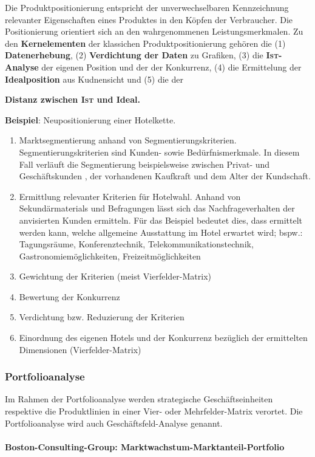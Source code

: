 Die Produktpositionierung entspricht der unverwechselbaren Kennzeichnung relevanter Eigenschaften eines Produktes in den Köpfen der Verbraucher. Die Positionierung orientiert sich an den wahrgenommenen Leistungsmerkmalen. Zu den {\bf Kernelementen} der klassichen Produktpositionierung gehören die (1) {\bf Datenerhebung}, (2) {\bf Verdichtung der Daten} zu Grafiken, (3) die {\bf \textsc{Ist}-Analyse} der eigenen Position und der der Konkurrenz, (4) die Ermittelung der {\bf Idealposition} aus Kudnensicht und (5) die der {\bf Distanz zwischen \textsc{Ist} und Ideal.

{\bf Beispiel}: Neupositionierung einer Hotelkette.
\begin{enumerate}
	\item Marktsegmentierung anhand von Segmentierungskriterien. Segmentierungskriterien sind Kunden- sowie Bedürfnismerkmale. In diesem Fall verläuft die Segmentierung beispielsweise zwischen Privat- und Geschäftskunden , der vorhandenen Kaufkraft und dem Alter der Kundschaft.
	\item Ermittlung relevanter Kriterien für Hotelwahl. Anhand von Sekundärmaterials und Befragungen lässt sich das Nachfrageverhalten der anvisierten Kunden ermitteln. Für das Beispiel bedeutet dies, dass ermittelt werden kann, welche allgemeine Ausstattung im Hotel erwartet wird; bspw.: Tagungsräume, Konferenztechnik, Telekommunikationstechnik, Gastronomiemöglichkeiten, Freizeitmöglichkeiten
	\item Gewichtung der Kriterien (meist Vierfelder-Matrix)
	\item Bewertung der Konkurrenz 
	\item Verdichtung bzw. Reduzierung der Kriterien
	\item Einordnung des eigenen Hotels und der Konkurrenz bezüglich der ermittelten Dimensionen (Vierfelder-Matrix)
\end{enumerate}	 
	 
\subsubsection{Portfolioanalyse}

Im Rahmen der Portfolioanalyse werden strategische Geschäftseinheiten respektive die Produktlinien in einer Vier- oder Mehrfelder-Matrix verortet. Die Portfolioanalyse wird auch Geschäftsfeld-Analyse genannt.

\paragraph{Boston-Consulting-Group: Marktwachstum-Marktanteil-Portfolio}~\\

}
